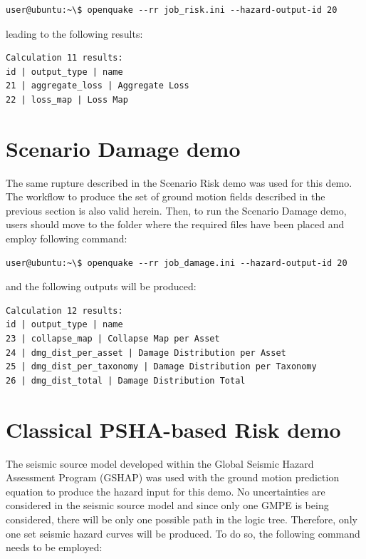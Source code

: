 \begin{Verbatim}[frame=single, commandchars=\\\{\}, samepage=true]
user@ubuntu:~\$ openquake --rr job_risk.ini --hazard-output-id 20
\end{Verbatim}

leading to the following results:

\begin{Verbatim}[frame=single, commandchars=\\\{\}, samepage=true]
Calculation 11 results:
id | output_type | name
21 | aggregate_loss | Aggregate Loss
22 | loss_map | Loss Map
\end{Verbatim}

\section{Scenario Damage demo}
The same rupture described in the Scenario Risk demo was used for this demo. The workflow to produce the set of ground motion fields described in the previous section is also valid herein. Then, to run the Scenario Damage demo, users should move to the folder where the required files have been placed and employ following command:

\begin{Verbatim}[frame=single, commandchars=\\\{\}, samepage=true]
user@ubuntu:~\$ openquake --rr job_damage.ini --hazard-output-id 20
\end{Verbatim}

and the following outputs will be produced:

\begin{Verbatim}[frame=single, commandchars=\\\{\}, samepage=true]
Calculation 12 results:
id | output_type | name
23 | collapse_map | Collapse Map per Asset
24 | dmg_dist_per_asset | Damage Distribution per Asset
25 | dmg_dist_per_taxonomy | Damage Distribution per Taxonomy
26 | dmg_dist_total | Damage Distribution Total
\end{Verbatim}

\section{Classical PSHA-based Risk demo}
\label{sec:classical_risk_demo}
The seismic source model developed within the Global Seismic Hazard Assessment Program (GSHAP) was used with the \cite{chiou2008} ground motion prediction equation to produce the hazard input for this demo. No uncertainties are considered in the seismic source model and since only one GMPE is being considered, there will be only one possible path in the logic tree. Therefore, only one set seismic hazard curves will be produced. To do so, the following command needs to be employed:

